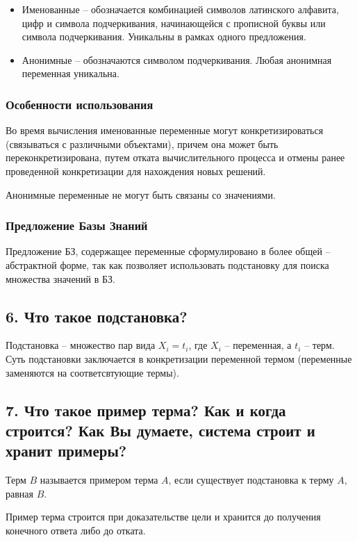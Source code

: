 \documentclass[a4paper,12pt]{article}
\begin{document}
	\begin{itemize}
		\item Именованные – обозначается комбинацией символов латинского алфавита,
		цифр и символа подчеркивания, начинающейся с прописной буквы или
		символа подчеркивания. Уникальны в рамках одного предложения.
		\item Анонимные – обозначаются символом подчеркивания. Любая анонимная
		переменная уникальна.
	\end{itemize}

	\subsubsection*{Особенности использования}
	
	Во время вычисления именованные переменные могут конкретизироваться
	(связываться с различными объектами), причем она может быть переконкретизирована, путем отката вычислительного процесса и отмены ранее проведенной конкретизации для нахождения новых решений.
	
	Анонимные переменные не могут быть связаны со значениями.
	
	\subsubsection*{Предложение Базы Знаний}
	
	Предложение БЗ, содержащее переменные сформулировано в более общей
	– абстрактной форме, так как позволяет использовать подстановку для поиска
	множества значений в БЗ.
	
	\subsection*{6.	Что такое подстановка?}
	
	Подстановка – множество пар вида ${X_i = t_i}$, где $X_i$ – переменная, а $t_i$
	– терм. Суть подстановки заключается в конкретизации переменной термом
	(переменные заменяются на соответсвтующие термы).
	
	\subsection*{7.	Что такое пример терма? Как и когда строится? Как Вы думаете, система строит и хранит примеры?}
	
	Терм $B$ называется примером терма $A$, если существует подстановка к терму $A$, равная $B$.
	
	Пример терма строится при доказательстве цели и хранится
	до получения конечного ответа либо до отката.
	
\end{document}
